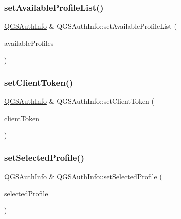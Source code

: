 \mbox{\label{class_q_g_s_auth_info_a1edc21d7b5f4a454575884a152f3f4d4}} 
\subsubsection{\texorpdfstring{set\+Available\+Profile\+List()}{setAvailableProfileList()}}
{\footnotesize\ttfamily \mbox{\hyperlink{class_q_g_s_auth_info}{Q\+G\+S\+Auth\+Info}} \& Q\+G\+S\+Auth\+Info\+::set\+Available\+Profile\+List (\begin{DoxyParamCaption}\item[{const Q\+List$<$ \mbox{\hyperlink{class_q_g_s_auth_info_1_1_q_g_s_profile}{Q\+G\+S\+Profile}} $>$ \&}]{available\+Profiles }\end{DoxyParamCaption})}

\mbox{\label{class_q_g_s_auth_info_a6f3d74c5fe35f13cf83c282b78e13e38}} 
\subsubsection{\texorpdfstring{set\+Client\+Token()}{setClientToken()}}
{\footnotesize\ttfamily \mbox{\hyperlink{class_q_g_s_auth_info}{Q\+G\+S\+Auth\+Info}} \& Q\+G\+S\+Auth\+Info\+::set\+Client\+Token (\begin{DoxyParamCaption}\item[{const Q\+String \&}]{client\+Token }\end{DoxyParamCaption})}

\mbox{\label{class_q_g_s_auth_info_a1cd711296277e98ff3362ec84ac94436}} 
\subsubsection{\texorpdfstring{set\+Selected\+Profile()}{setSelectedProfile()}}
{\footnotesize\ttfamily \mbox{\hyperlink{class_q_g_s_auth_info}{Q\+G\+S\+Auth\+Info}} \& Q\+G\+S\+Auth\+Info\+::set\+Selected\+Profile (\begin{DoxyParamCaption}\item[{const \mbox{\hyperlink{class_q_g_s_auth_info_1_1_q_g_s_profile}{Q\+G\+S\+Profile}} \&}]{selected\+Profile }\end{DoxyParamCaption})}

